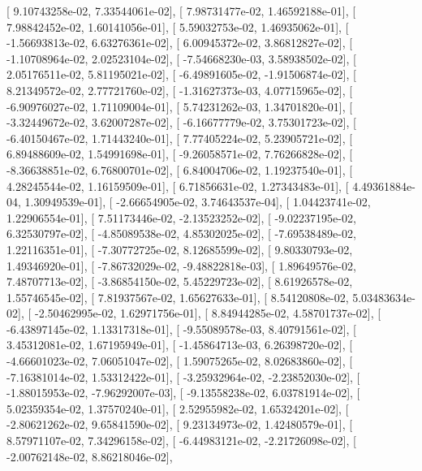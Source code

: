\documentclass{article}
\begin{document}
       [  9.10743258e-02,   7.33544061e-02],
       [  7.98731477e-02,   1.46592188e-01],
       [  7.98842452e-02,   1.60141056e-01],
       [  5.59032753e-02,   1.46935062e-01],
       [ -1.56693813e-02,   6.63276361e-02],
       [  6.00945372e-02,   3.86812827e-02],
       [ -1.10708964e-02,   2.02523104e-02],
       [ -7.54668230e-03,   3.58938502e-02],
       [  2.05176511e-02,   5.81195021e-02],
       [ -6.49891605e-02,  -1.91506874e-02],
       [  8.21349572e-02,   2.77721760e-02],
       [ -1.31627373e-03,   4.07715965e-02],
       [ -6.90976027e-02,   1.71109004e-01],
       [  5.74231262e-03,   1.34701820e-01],
       [ -3.32449672e-02,   3.62007287e-02],
       [ -6.16677779e-02,   3.75301723e-02],
       [ -6.40150467e-02,   1.71443240e-01],
       [  7.77405224e-02,   5.23905721e-02],
       [  6.89488609e-02,   1.54991698e-01],
       [ -9.26058571e-02,   7.76266828e-02],
       [ -8.36638851e-02,   6.76800701e-02],
       [  6.84004706e-02,   1.19237540e-01],
       [  4.28245544e-02,   1.16159509e-01],
       [  6.71856631e-02,   1.27343483e-01],
       [  4.49361884e-04,   1.30949539e-01],
       [ -2.66654905e-02,   3.74643537e-04],
       [  1.04423741e-02,   1.22906554e-01],
       [  7.51173446e-02,  -2.13523252e-02],
       [ -9.02237195e-02,   6.32530797e-02],
       [ -4.85089538e-02,   4.85302025e-02],
       [ -7.69538489e-02,   1.22116351e-01],
       [ -7.30772725e-02,   8.12685599e-02],
       [  9.80330793e-02,   1.49346920e-01],
       [ -7.86732029e-02,  -9.48822818e-03],
       [  1.89649576e-02,   7.48707713e-02],
       [ -3.86854150e-02,   5.45229723e-02],
       [  8.61926578e-02,   1.55746545e-02],
       [  7.81937567e-02,   1.65627633e-01],
       [  8.54120808e-02,   5.03483634e-02],
       [ -2.50462995e-02,   1.62971756e-01],
       [  8.84944285e-02,   4.58701737e-02],
       [ -6.43897145e-02,   1.13317318e-01],
       [ -9.55089578e-03,   8.40791561e-02],
       [  3.45312081e-02,   1.67195949e-01],
       [ -1.45864713e-03,   6.26398720e-02],
       [ -4.66601023e-02,   7.06051047e-02],
       [  1.59075265e-02,   8.02683860e-02],
       [ -7.16381014e-02,   1.53312422e-01],
       [ -3.25932964e-02,  -2.23852030e-02],
       [ -1.88015953e-02,  -7.96292007e-03],
       [ -9.13558238e-02,   6.03781914e-02],
       [  5.02359354e-02,   1.37570240e-01],
       [  2.52955982e-02,   1.65324201e-02],
       [ -2.80621262e-02,   9.65841590e-02],
       [  9.23134973e-02,   1.42480579e-01],
       [  8.57971107e-02,   7.34296158e-02],
       [ -6.44983121e-02,  -2.21726098e-02],
       [ -2.00762148e-02,   8.86218046e-02],
\end{document}
